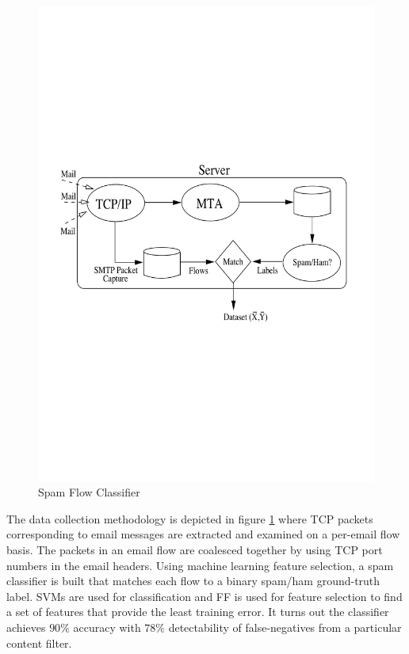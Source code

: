 \begin{figure}[h!]
\begin{center}
  \includegraphics* [width=0.7\linewidth]{figures/email-flow}	
  \caption{Spam Flow Classifier \cite{rbeverly:2008}}
  \label{fig:email-flow}
\end{center}
\end{figure}
The data collection methodology is depicted in figure \ref{fig:email-flow} where \ac{TCP} packets corresponding to email messages are extracted and examined on a per-email flow basis. The packets in an email flow are coalesced together by using \ac{TCP} port numbers in the email headers. Using machine learning feature selection,  a spam classifier is built that matches each flow to a binary spam/ham ground-truth label. \ac{SVMs} \cite{vvapnik:1995} are used for classification and \ac{FF} \cite{yyang:1997} is used for feature selection to find a set of features that provide the least training error. It turns out the classifier achieves $90\%$ accuracy with $78\%$ detectability of false-negatives from a particular content filter. 